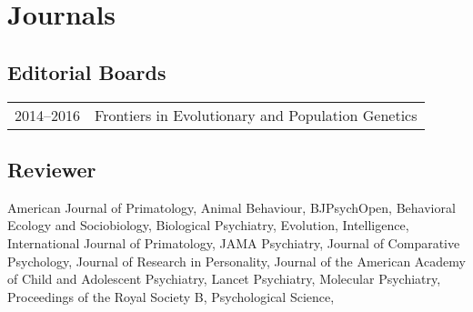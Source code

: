 \documentclass[11pt]{article}
\begin{document}
\section*{Journals}

\subsection*{Editorial Boards}

\begin{tabular}{p{3cm}p{12cm}}

2014--2016 & Frontiers in Evolutionary and Population Genetics 

\end{tabular}

\subsection*{Reviewer}

American Journal of Primatology, 
Animal Behaviour,
BJPsychOpen, 
Behavioral Ecology and Sociobiology, 
Biological Psychiatry, 
Evolution, 
Intelligence, 
International Journal of Primatology, 
JAMA Psychiatry, 
Journal of Comparative Psychology, 
Journal of Research in Personality, 
Journal of the American Academy of Child and Adolescent Psychiatry, 
Lancet Psychiatry, 
Molecular Psychiatry, 
Proceedings of the Royal Society B, 
Psychological Science, 
\end{document}
